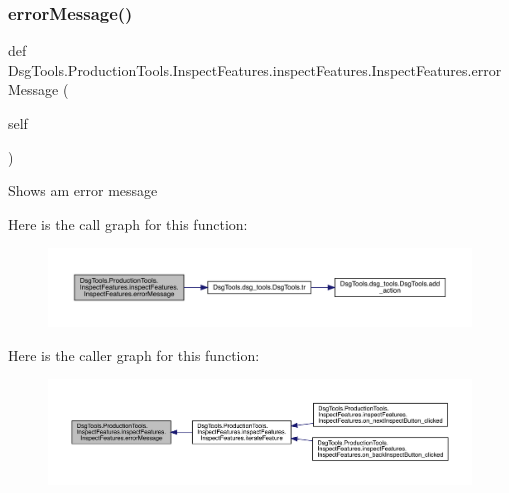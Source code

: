 \subsubsection{\texorpdfstring{error\+Message()}{errorMessage()}}
{\footnotesize\ttfamily def Dsg\+Tools.\+Production\+Tools.\+Inspect\+Features.\+inspect\+Features.\+Inspect\+Features.\+error\+Message (\begin{DoxyParamCaption}\item[{}]{self }\end{DoxyParamCaption})}

\begin{DoxyVerb}Shows am error message
\end{DoxyVerb}
 Here is the call graph for this function\+:
\nopagebreak
\begin{figure}[H]
\begin{center}
\leavevmode
\includegraphics[width=350pt]{class_dsg_tools_1_1_production_tools_1_1_inspect_features_1_1inspect_features_1_1_inspect_features_a6346e3767e0187d8350e3eb1647d9e0b_cgraph}
\end{center}
\end{figure}
Here is the caller graph for this function\+:
\nopagebreak
\begin{figure}[H]
\begin{center}
\leavevmode
\includegraphics[width=350pt]{class_dsg_tools_1_1_production_tools_1_1_inspect_features_1_1inspect_features_1_1_inspect_features_a6346e3767e0187d8350e3eb1647d9e0b_icgraph}
\end{center}
\end{figure}
\mbox{\label{class_dsg_tools_1_1_production_tools_1_1_inspect_features_1_1inspect_features_1_1_inspect_features_a443772b701b244f7da7f33686a0b9fde}} 
